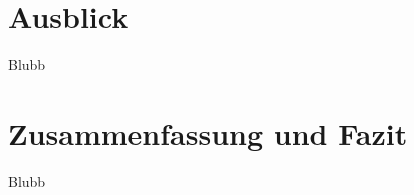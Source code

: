 \documentclass[researchlab,palatino]{AIGpaper}
\begin{document}
\section{Ausblick}
Blubb

\section{Zusammenfassung und Fazit}
Blubb
\addreferences

\end{document}
